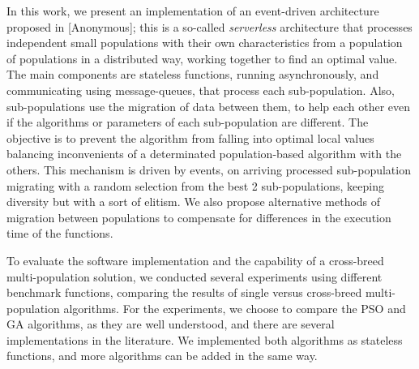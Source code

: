 \documentclass[runningheads]{llncs}
\begin{document}
In this work, we present an implementation of an event-driven architecture
proposed in [Anonymous]; this is a so-called {\em serverless}
architecture that
processes independent small populations with their own characteristics %
from a population of populations in a distributed way, working together to find an optimal value. %
The main components are stateless functions,
running asynchronously, and communicating using message-queues, that process each
sub-population. Also, sub-populations use the migration of data between them, to
help each other even if the algorithms or parameters of each sub-population are
different. The objective is to prevent the algorithm from falling into optimal
local values balancing inconvenients of a determinated population-based algorithm with the others.
This mechanism is driven by events, on arriving processed sub-population migrating with a random selection 
from the best 2 sub-populations, keeping diversity but with a sort of elitism. 
We also
propose alternative methods of migration between populations to compensate for
differences in the execution time of the functions. %




To evaluate the software implementation and the capability of a cross-breed multi-population solution,
we conducted several experiments using different benchmark functions, comparing the
results of single versus cross-breed multi-population algorithms. For the experiments, we choose to
compare the PSO and GA algorithms, as they are well understood, and there are
several implementations in the literature. We implemented both algorithms as
stateless functions, and more algorithms can be added in the same way.
\end{document}

